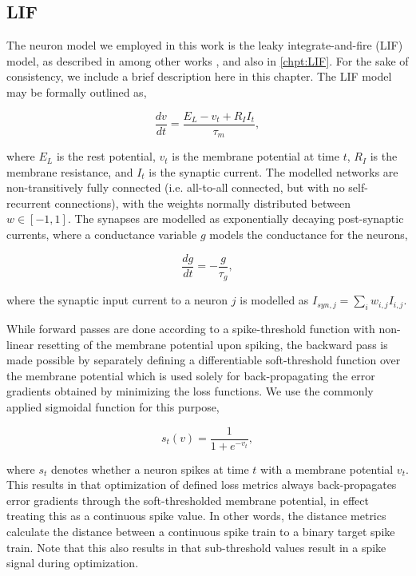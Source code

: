 \documentclass[mphil,deptreport,ianc]{infthesis} %
\begin{document}
\subsection{LIF}


The neuron model we employed in this work is the leaky integrate-and-fire (LIF) model, as described in among other works \cite{Rolls1998Book}, and also in 
\ref{chpt:LIF}. For the sake of consistency, we include a brief description here in this chapter. The LIF model may be formally outlined as,

\begin{equation}
    \frac{dv}{dt} = \frac{E_L - v_t + R_I I_t}{\tau_m},
\end{equation}

where $E_L$ is the rest potential, $v_t$ is the membrane potential at time $t$, $R_I$ is the membrane resistance, and $I_t$ is the synaptic current.
The modelled networks are non-transitively fully connected (i.e. all-to-all connected, but with no self-recurrent connections), with the weights normally distributed between $w \in [-1, 1]$. The synapses are modelled as exponentially decaying post-synaptic currents, where a conductance variable $g$ models the conductance for the neurons,

\begin{equation}
    \frac{dg}{dt} = -\frac{g}{\tau_g},
\end{equation}

where the synaptic input current to a neuron $j$ is modelled as $I_{syn,j} = \sum_{i} w_{i,j} I_{i,j}$.

While forward passes are done according to a spike-threshold function with non-linear resetting of the membrane potential upon spiking, the backward pass is made possible by separately defining a differentiable soft-threshold function over the membrane potential which is used solely for back-propagating the error gradients obtained by minimizing the loss functions. We use the commonly applied sigmoidal function for this purpose,

\begin{equation}
    s_t(v) = \frac{1}{1+e^{-v_t}},
\end{equation}

where $s_t$ denotes whether a neuron spikes at time $t$ with a membrane potential $v_t$.
This results in that optimization of defined loss metrics always back-propagates error gradients through the soft-thresholded membrane potential, in effect treating this as a continuous spike value. 
In other words, the distance metrics calculate the distance between a continuous spike train to a binary target spike train.
Note that this also results in that sub-threshold values result in a spike signal during optimization.
\end{document}
